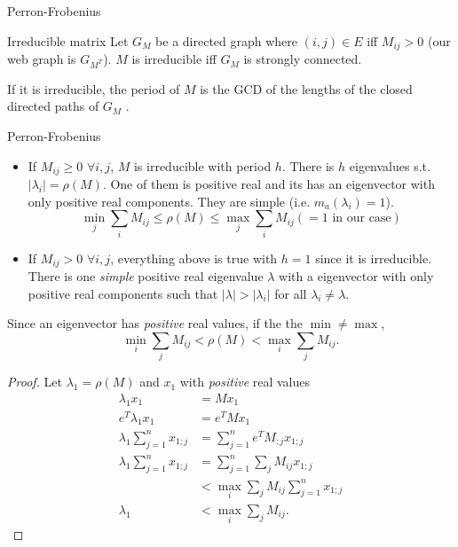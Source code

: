 \documentclass[10pt]{beamer}
\begin{document}
\begin{frame}[allowframebreaks]{Perron-Frobenius}
  \begin{block}{Irreducible matrix}
    Let $G_M$ be a directed graph where $(i,j) \in E$ iff $M_{ij} > 0$ (our web graph is $G_{M^T}$).
    $M$ is irreducible iff $G_M$ is strongly connected.

    If it is irreducible, the period of $M$ is the GCD of the lengths of the closed directed paths
    of $G_M$
    \cite[p.~16]{kitchens1998symbolic}.
  \end{block}
  \begin{block}{Perron-Frobenius}
    \begin{itemize}
      \item If $M_{ij} \geq 0$ $\forall i,j$, $M$ is irreducible with period $h$.
        There is $h$ eigenvalues s.t. $|\lambda_i| = \rho(M)$.
        One of them is positive real and its has an eigenvector with only positive real components.
        They are simple (i.e. $m_a(\lambda_i) = 1$).
        \[ \min_j \sum_i M_{ij} \leq \rho(M) \leq \max_j \sum_i M_{ij} (= 1 \text{ in our case}) \]
      \item If $M_{ij} > 0$ $\forall i,j$, everything above is true with $h=1$ since it is irreducible.
        There is one \emph{simple} positive real eigenvalue $\lambda$ with a eigenvector with only positive real components
        such that $|\lambda| > |\lambda_i|$ for all $\lambda_i \neq \lambda$.
    \end{itemize}
  \end{block}
  \framebreak

  Since an eigenvector has \emph{positive} real values, if the the $\min \neq \max$,
  \[ \min_i \sum_j M_{ij} < \rho(M) < \max_i \sum_j M_{ij}. \]
  \begin{proof}
    Let $\lambda_1 = \rho(M)$ and $x_1$ with \emph{positive} real values
    \begin{align*}
      \lambda_1 x_1 & = Mx_1\\
      e^T\lambda_1 x_1 & = e^TMx_1\\
      \lambda_1 \sum_{j=1}^n x_{1;j} & = \sum_{j=1}^n e^T M_{:j} x_{1;j}\\
      \lambda_1 \sum_{j=1}^n x_{1;j} & = \sum_{j=1}^n \sum_j M_{ij} x_{1;j}\\
                                     & < \max_i \sum_j M_{ij} \sum_{j=1}^n x_{1;j}\\
      \lambda_1                      & < \max_i \sum_j M_{ij}.
    \end{align*}
  \end{proof}
\end{frame}
\end{document}
